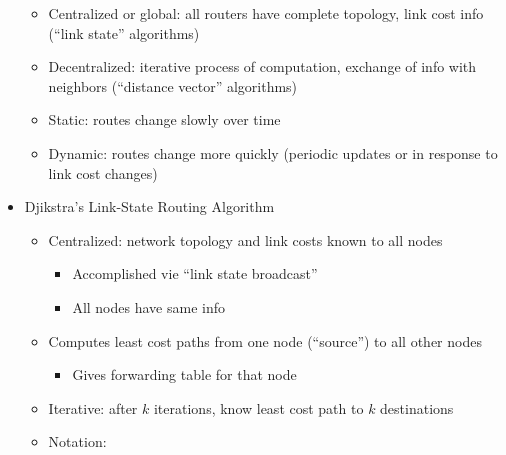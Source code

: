\begin{itemize}
    \begin{itemize}

      \item Centralized or global: all routers have complete topology, link cost info (``link state'' algorithms)

      \item Decentralized: iterative process of computation, exchange of info with neighbors (``distance vector'' algorithms)

      \item Static: routes change slowly over time

      \item Dynamic: routes change more quickly (periodic updates or in response to link cost changes)

    \end{itemize}

  \item Djikstra's Link-State Routing Algorithm

    \begin{itemize}

      \item Centralized: network topology and link costs known to all nodes

        \begin{itemize}

          \item Accomplished vie ``link state broadcast''

          \item All nodes have same info

        \end{itemize}

      \item Computes least cost paths from one node (``source'') to all other nodes

        \begin{itemize}

          \item Gives forwarding table for that node

        \end{itemize}

      \item Iterative: after $k$ iterations, know least cost path to $k$ destinations

      \item Notation:

        \begin{itemize}


\end{itemize}
\end{itemize}
\end{itemize}
